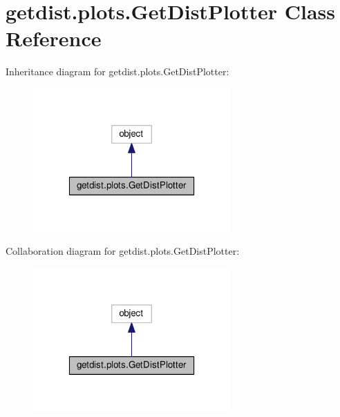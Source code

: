 \hypertarget{classgetdist_1_1plots_1_1GetDistPlotter}{}\section{getdist.\+plots.\+Get\+Dist\+Plotter Class Reference}
\label{classgetdist_1_1plots_1_1GetDistPlotter}


Inheritance diagram for getdist.\+plots.\+Get\+Dist\+Plotter\+:
\nopagebreak
\begin{figure}[H]
\begin{center}
\leavevmode
\includegraphics[width=214pt]{classgetdist_1_1plots_1_1GetDistPlotter__inherit__graph}
\end{center}
\end{figure}


Collaboration diagram for getdist.\+plots.\+Get\+Dist\+Plotter\+:
\nopagebreak
\begin{figure}[H]
\begin{center}
\leavevmode
\includegraphics[width=214pt]{classgetdist_1_1plots_1_1GetDistPlotter__coll__graph}
\end{center}
\end{figure}

